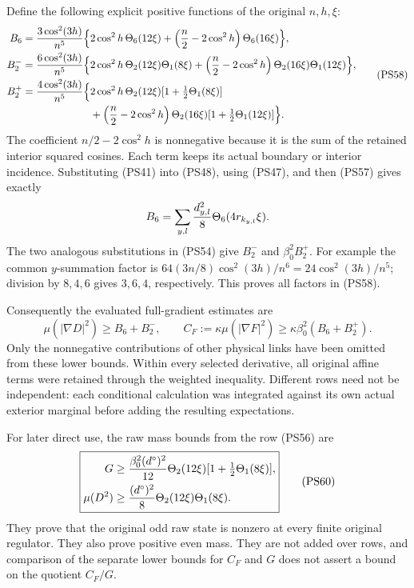 \documentclass[11pt]{article}
\begin{document}
Define the following explicit positive functions of the original
\(n,h,\xi\):
\[
 \begin{aligned}
 B_6={3\cos^2(3h)\over n^5}
 \Big\{&2\cos^2h\,\Theta_6(12\xi)
        +\left({n\over2}-2\cos^2h\right)\Theta_6(16\xi)\Big\},\\
 B_2^-={6\cos^2(3h)\over n^5}
 \Big\{&2\cos^2h\,\Theta_2(12\xi)\Theta_1(8\xi)
    +\left({n\over2}-2\cos^2h\right)
                             \Theta_2(16\xi)\Theta_1(12\xi)\Big\},\\
 B_2^+={4\cos^2(3h)\over n^5}
 \Big\{&2\cos^2h\,\Theta_2(12\xi)
                                  [1+\tfrac12\Theta_1(8\xi)]\\
       &+\left({n\over2}-2\cos^2h\right)\Theta_2(16\xi)
                                  [1+\tfrac12\Theta_1(12\xi)]\Big\}.
 \end{aligned}
 \tag{PS58}
\]
The coefficient \(n/2-2\cos^2h\) is nonnegative because it is
the sum of the retained interior squared cosines. Each term keeps
its actual boundary or interior incidence.
Substituting (PS41) into (PS48), using (PS47), and then (PS57)
gives exactly
\[
 B_6=\sum_{y,l}{d_{y,l}^2\over8}\Theta_6(4r_{k_{y,l}}\xi).
 \]
The two analogous substitutions in (PS54) give \(B_2^-\) and
\(\beta_0^2B_2^+\). For example the common \(y\)-summation factor
is \(64(3n/8)\cos^2(3h)/n^6=24\cos^2(3h)/n^5\);
division by \(8,4,6\) gives \(3,6,4\), respectively.
This proves all factors in (PS58).

Consequently the evaluated full-gradient estimates are
\[
 \boxed{\mu(|\nabla D|^2)\ge B_6+B_2^-,
 \qquad
 C_F:=\kappa\mu(|\nabla F|^2)
                  \ge\kappa\beta_0^2(B_6+B_2^+).}
 \tag{PS59}
\]
Only the nonnegative contributions of other physical links have
been omitted from these lower bounds. Within every selected
derivative, all original affine terms were retained through the
weighted inequality. Different rows need not be independent:
each conditional calculation was integrated against its own
actual exterior marginal before adding the resulting expectations.

For later direct use, the raw mass bounds from the row (PS56) are
\[
 \boxed{\begin{aligned}
 G&\ge{\beta_0^2(d^\circ)^2\over12}
       \Theta_2(12\xi)[1+\tfrac12\Theta_1(8\xi)],\\
 \mu(D^2)&\ge{(d^\circ)^2\over8}
                        \Theta_2(12\xi)\Theta_1(8\xi).
 \end{aligned}}
 \tag{PS60}
\]
They prove that the original odd raw state is nonzero at every
finite original regulator. They also prove positive even mass.
They are not added over rows, and comparison of the separate
lower bounds for \(C_F\) and \(G\) does not assert a bound on
the quotient \(C_F/G\).
\end{document}
